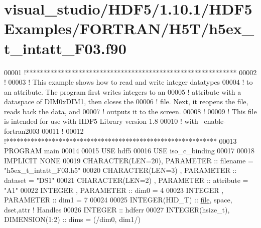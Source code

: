 \hypertarget{visual__studio_2_h_d_f5_21_810_81_2_h_d_f5_examples_2_f_o_r_t_r_a_n_2_h5_t_2h5ex__t__intatt___f03_8f90_source}{}\section{visual\+\_\+studio/\+H\+D\+F5/1.10.1/\+H\+D\+F5\+Examples/\+F\+O\+R\+T\+R\+A\+N/\+H5\+T/h5ex\+\_\+t\+\_\+intatt\+\_\+\+F03.f90}
\label{visual__studio_2_h_d_f5_21_810_81_2_h_d_f5_examples_2_f_o_r_t_r_a_n_2_h5_t_2h5ex__t__intatt___f03_8f90_source}

\begin{DoxyCode}
00001 \textcolor{comment}{!************************************************************}
00002 \textcolor{comment}{!}
00003 \textcolor{comment}{!  This example shows how to read and write integer datatypes}
00004 \textcolor{comment}{!  to an attribute.  The program first writes integers to an}
00005 \textcolor{comment}{!  attribute with a dataspace of DIM0xDIM1, then closes the}
00006 \textcolor{comment}{!  file.  Next, it reopens the file, reads back the data, and}
00007 \textcolor{comment}{!  outputs it to the screen.}
00008 \textcolor{comment}{!}
00009 \textcolor{comment}{!  This file is intended for use with HDF5 Library version 1.8}
00010 \textcolor{comment}{!  with --enable-fortran2003}
00011 \textcolor{comment}{!}
00012 \textcolor{comment}{!************************************************************}
00013 \textcolor{keyword}{PROGRAM} main
00014 
00015   \textcolor{keywordtype}{USE }hdf5
00016   \textcolor{keywordtype}{USE }iso\_c\_binding
00017 
00018   \textcolor{keywordtype}{IMPLICIT NONE}
00019   \textcolor{keywordtype}{CHARACTER(LEN=20)}, \textcolor{keywordtype}{PARAMETER} :: filename  = \textcolor{stringliteral}{"h5ex\_t\_intatt\_F03.h5"}
00020   \textcolor{keywordtype}{CHARACTER(LEN=3)} , \textcolor{keywordtype}{PARAMETER} :: dataset   = \textcolor{stringliteral}{"DS1"}
00021   \textcolor{keywordtype}{CHARACTER(LEN=2)} , \textcolor{keywordtype}{PARAMETER} :: attribute = \textcolor{stringliteral}{"A1"}
00022   \textcolor{keywordtype}{INTEGER}          , \textcolor{keywordtype}{PARAMETER} :: dim0      = 4
00023   \textcolor{keywordtype}{INTEGER}          , \textcolor{keywordtype}{PARAMETER} :: dim1      = 7
00024 
00025   \textcolor{keywordtype}{INTEGER(HID\_T)}  :: \hyperlink{structfile}{file}, space, dset,attr \textcolor{comment}{! Handles}
00026   \textcolor{keywordtype}{INTEGER} :: hdferr
00027   \textcolor{keywordtype}{INTEGER(hsize\_t)},   \textcolor{keywordtype}{DIMENSION(1:2)} :: dims = (/dim0, dim1/)

\end{DoxyCode}
